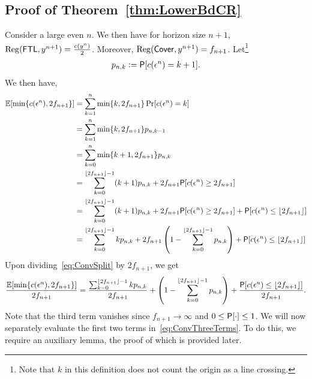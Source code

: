 %

\subsection{Proof of Theorem~\ref{thm:LowerBdCR}}
    Consider a large even $n$. We then have for horizon size $n+1$, $\mathrm{Reg}(\mathsf{FTL},y^{n+1}) = \frac{c(y^n)}{2}$.  Moreover, $\mathrm{Reg}(\mathsf{Cover},y^{n+1}) = f_{n+1}$. Let\footnote{Note that $k$ in this definition does not count the origin as a line crossing.}
    \begin{align}\label{eq:PnkDefn}
        p_{n,k} \mathrel{\mathop{:}}= \mathsf{P}[c(\epsilon^{n}) = k+1].
    \end{align}
    We then have,
    \begin{align}
     \operatorname{\mathbb{E}}[\min\{c(\epsilon^n), 2f_{n+1}\}] &= \sum_{k=1}^n \min\{k, 2f_{n+1}\} \Pr[c(\epsilon^n) = k]\nonumber\\
        &= \sum_{k=1}^n \min\{k, 2f_{n+1}\} p_{n,k-1} \nonumber\\
        &= \sum_{k=0}^n \min\{k+1,2f_{n+1}\}p_{n,k} \nonumber\\
        &= \sum_{k=0}^{\lfloor 2f_{n+1} \rfloor-1} (k+1)p_{n,k} + 2f_{n+1} \mathsf{P}[c(\epsilon^n) \ge 2f_{n+1}] \nonumber\\
        &= \sum_{k=0}^{\lfloor 2f_{n+1} \rfloor-1} (k+1)p_{n,k} + 2f_{n+1} \mathsf{P}[c(\epsilon^n) \ge 2f_{n+1}] + \mathsf{P}[c(\epsilon^n) \le \lfloor 2f_{n+1}\rfloor] \nonumber\\
        &=  \sum_{k=0}^{\lfloor 2f_{n+1} \rfloor-1} kp_{n,k} + 2f_{n+1} \left(1-\sum_{k=0}^{\lfloor 2f_{n+1} \rfloor-1} p_{n,k}\right) +  \mathsf{P}[c(\epsilon^n) \le \lfloor 2f_{n+1}\rfloor] \label{eq:ConvSplit}
    \end{align} 
    Upon dividing~\cref{eq:ConvSplit} by $2f_{n+1}$, we get 
    \begin{align} \label{eq:ConvThreeTerms}
      \frac{\operatorname{\mathbb{E}}[\min\{c(\epsilon^n), 2f_{n+1}\}]}{2f_{n+1}}  = \frac{\sum_{k=0}^{\lfloor 2f_{n+1} \rfloor-1} kp_{n,k}}{2f_{n+1}} +  \left(1-\sum_{k=0}^{\lfloor 2f_{n+1} \rfloor-1} p_{n,k}\right) +  \frac{\mathsf{P}[c(\epsilon^n) \le \lfloor 2f_{n+1}\rfloor]}{2f_{n+1}}.
    \end{align}
    Note that the third term vanishes since $f_{n+1} \to \infty$ and $0 \le \mathsf{P}[\cdot] \le 1$. We will now separately evaluate the first two terms in~\cref{eq:ConvThreeTerms}. To do this, we require an auxiliary lemma, the proof of which is provided later.
